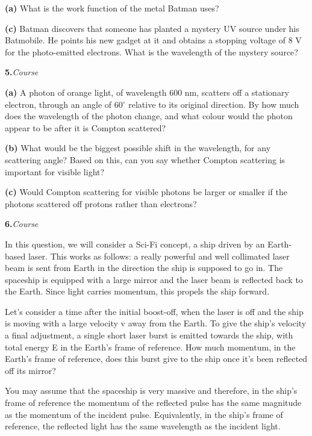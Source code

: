 \documentclass[12pt,letterpaper]{article}
\newcommand{\question}[2]{\noindent\textbf{#1.}\hfill\textit{#2}\par\medskip}
\begin{document}
\textbf{(a)} What is the work function of the metal Batman uses?


\vfill

\textbf{(c)} Batman discovers that someone has planted a mystery UV source under his Batmobile. He points his new gadget at it and obtains a stopping voltage of 8 V for the photo-emitted electrons. What is the wavelength of the mystery source?


\newpage

\question{5}{Course}

\textbf{(a)} A photon of orange light, of wavelength 600 nm, scatters off a stationary electron, through an angle of 60\ensuremath{^\circ} relative to its original direction. By how much does the wavelength of the photon change, and what colour would the photon appear to be after it is Compton scattered?


\vfill

\textbf{(b)} What would be the biggest possible shift in the wavelength, for any scattering angle? Based on this, can you say whether Compton scattering is important for visible light?


\vfill

\textbf{(c)} Would Compton scattering for visible photons be larger or smaller if the photons scattered off protons rather than electrons?


\newpage

\question{6}{Course}

In this question, we will consider a Sci-Fi concept, a ship driven by an Earth-based laser. This works as follows: a really powerful and well collimated laser beam is sent from Earth in the direction the ship is supposed to go in. The spaceship is equipped with a large mirror and the laser beam is reflected back to the Earth. Since light carries momentum, this propels the ship forward.


Let's consider a time after the initial boost-off, when the laser is off and the ship is moving with a large velocity v away from the Earth. To give the ship's velocity a final adjustment, a single short laser burst is emitted towards the ship, with total energy E in the Earth's frame of reference. How much momentum, in the Earth's frame of reference, does this burst give to the ship once it's been reflected off its mirror?


You may assume that the spaceship is very massive and therefore, in the ship's frame of reference the momentum of the reflected pulse has the same magnitude as the momentum of the incident pulse. Equivalently, in the ship's frame of reference, the reflected light has the same wavelength as the incident light.
\end{document}
